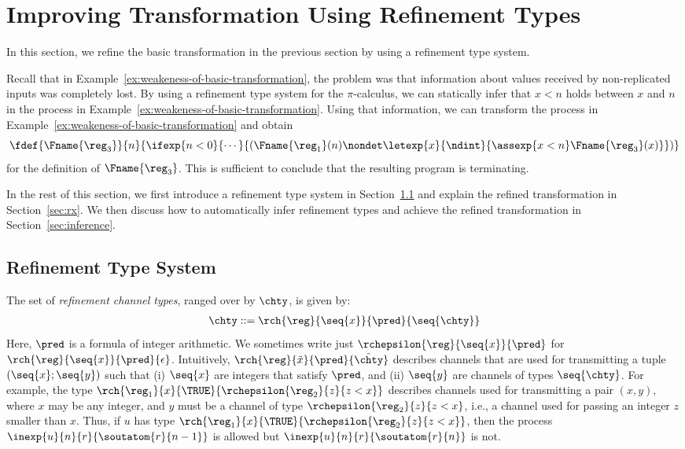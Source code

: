 \section{Improving Transformation Using Refinement Types}  \label{sec:refinement}

In this section, we refine the basic transformation in the previous section
by using a refinement type system.

Recall that in Example~\ref{ex:weakeness-of-basic-transformation},
the problem was that information about values received by non-replicated
inputs was completely lost.
By using a refinement type system for the \(\pi\)-calculus,
we can statically infer that \(x<n\) holds between \(x\) and \(n\) in
the process in Example~\ref{ex:weakeness-of-basic-transformation}.
Using that information, we can transform the process in Example~\ref{ex:weakeness-of-basic-transformation} and obtain
\[
    \fdef{\Fname{\reg_3}}{n}{\ifexp{n<0}{\cdots}
            {(\Fname{\reg_1}(n) \nondet \letexp{x}{\ndint}{\assexp{x < n}\Fname{\reg_3}(x)}})}
\]
for the definition of \( \Fname{\reg_3}\).
This is sufficient to conclude that the resulting program is terminating.

In the rest of this section, we first introduce a refinement type system
in Section~\ref{sec:rtype} and explain the refined transformation in Section~\ref{sec:rx}.
We then discuss how to automatically infer refinement types and
achieve the refined transformation in Section~\ref{sec:inference}.



\subsection{Refinement Type System}
\label{sec:rtype}


The set of \emph{refinement channel types}, ranged over by $\chty$, is given by:
\begin{align*}
    \chty ::= \rch{\reg}{\seq{x}}{\pred}{\seq{\chty}}
\end{align*}
Here, \(\pred\) is a formula of integer arithmetic.
We sometimes write just
\(\rchepsilon{\reg}{\seq{x}}{\pred}\) for
\(\rch{\reg}{\seq{x}}{\pred}{\epsilon}\).
Intuitively, 
$\rch{\reg}{\tilde{x}}{\pred}{\tilde{\chty}}$
describes channels that are used for transmitting
a tuple \((\seq{x};\seq{y})\) such that (i) \(\seq{x}\) are integers
that satisfy \(\pred\), and (ii) \(\seq{y}\) are channels of types \(\seq{\chty}\).
For example, the type
\(\rch{\reg_1}{x}{\TRUE}{\rchepsilon{\reg_2}{z}{z<x}}\)
describes channels used for transmitting a pair
\((x, y)\), where \(x\) may be any integer, and \(y\) must be a channel of
type \(\rchepsilon{\reg_2}{z}{z<x}\), i.e.,
a channel used for passing an integer \(z\) smaller than \(x\).%
Thus, if \(u\) has type \(\rch{\reg_1}{x}{\TRUE}{\rchepsilon{\reg_2}{z}{z<x}}\),
then the process
\(\inexp{u}{n}{r}{\soutatom{r}{n-1}}\) is allowed
but \(\inexp{u}{n}{r}{\soutatom{r}{n}}\) is not.


